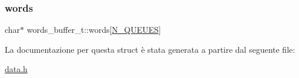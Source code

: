 \subsubsection{\texorpdfstring{words}{words}}
{\footnotesize\ttfamily char$\ast$ words\+\_\+buffer\+\_\+t\+::words\mbox{[}\hyperlink{data_8h_abbb1a97343fdbf54e75f14fb83cb0a92}{N\+\_\+\+Q\+U\+E\+U\+ES}\mbox{]}}



La documentazione per questa struct è stata generata a partire dal seguente file\+:\begin{DoxyCompactItemize}
\item 
\hyperlink{data_8h}{data.\+h}\end{DoxyCompactItemize}
